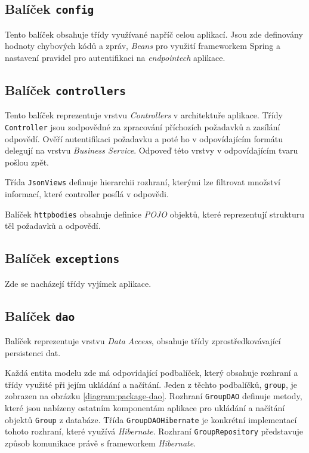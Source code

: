 \documentclass[thesis=B,czech]{FITthesis}[2012/06/26]
\begin{document}
		\subsection{Balíček \texttt{config}}
			Tento balíček obsahuje třídy využívané napříč celou aplikací. Jsou zde definovány hodnoty chybových kódů a zpráv, \textit{Beans} pro využití frameworkem Spring a nastavení pravidel pro autentifikaci na \textit{endpointech} aplikace.
			
		\subsection{Balíček \texttt{controllers}}
			Tento balíček reprezentuje vrstvu \textit{Controllers} v architektuře aplikace. Třídy \texttt{Controller} jsou zodpovědné za zpracování příchozích požadavků a zasílání odpovědí. Ověří autentifikaci požadavku a poté ho v odpovídajícím formátu delegují na vrstvu \textit{Business Service}. Odpoveď této vrstvy v odpovídajícím tvaru pošlou zpět.
			
			Třída \texttt{JsonViews} definuje hierarchii rozhraní, kterými lze filtrovat množství informací, které controller posílá v odpovědi.
			
			Balíček \texttt{httpbodies} obsahuje definice \textit{POJO} objektů, které reprezentují strukturu těl požadavků a odpovědí.
			
		\subsection{Balíček \texttt{exceptions}}
			Zde se nacházejí třídy vyjímek aplikace.
			
		\subsection{Balíček \texttt{dao}}
			Balíček reprezentuje vrstvu \textit{Data Access}, obsahuje třídy zprostředkovávající persistenci dat.
			
			Každá entita modelu zde má odpovídající podbalíček, který obsahuje rozhraní a třídy využité při jejím ukládání a načítání. Jeden z těchto podbalíčků, \texttt{group}, je zobrazen na obrázku \ref{diagram:package-dao}. Rozhraní \texttt{GroupDAO} definuje metody, které jsou nabízeny ostatním komponentám aplikace pro ukládání a načítání objektů \texttt{Group} z databáze. Třída \texttt{GroupDAOHibernate} je konkrétní implementací tohoto rozhraní, které využívá \textit{Hibernate}. Rozhraní \texttt{GroupRepository} představuje způsob komunikace právě s frameworkem \textit{Hibernate}.
			
\end{document}
